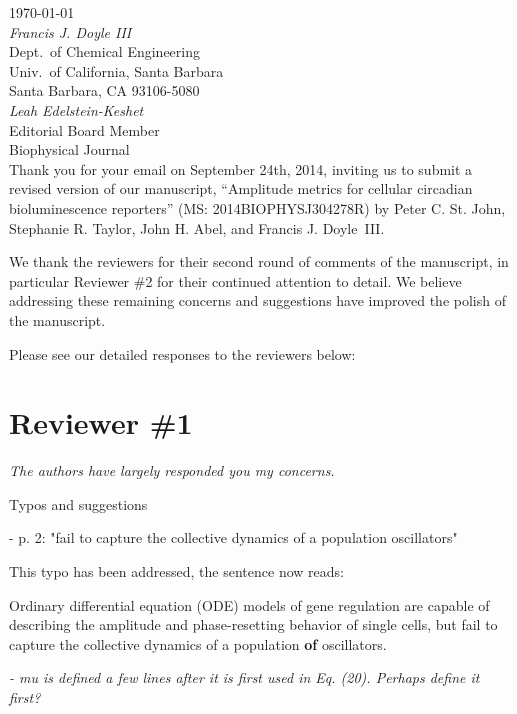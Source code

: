\documentclass[11pt, letterpaper]{article}
\newenvironment{reviewer}{\itshape\color{gray}}{}
\newenvironment{manuscript}[1]{\begin{center}\begin{tcolorbox}[colback=green!5!white,colframe=green!75!black,width=0.8\textwidth,title={#1},breakable,fonttitle=\bfseries]}{\end{tcolorbox}\end{center}}
\begin{document}
\today\\

{\itshape Francis J. Doyle III}\\
Dept.\ of Chemical Engineering\\
Univ.\ of California, Santa Barbara\\
Santa Barbara, CA 93106-5080\\

{\itshape Leah Edelstein-Keshet}\\
Editorial Board Member\\
Biophysical Journal\\

Thank you for your email on September 24th, 2014, inviting us to submit a revised version of our manuscript, ``Amplitude metrics for cellular circadian bioluminescence reporters'' (MS: 2014BIOPHYSJ304278R) by Peter C. St. John, Stephanie R. Taylor, John H. Abel, and Francis J. Doyle~III.

We thank the reviewers for their second round of comments of the manuscript, in particular Reviewer \#2 for their continued attention to detail. We believe addressing these remaining concerns and suggestions have improved the polish of the manuscript.

Please see our detailed responses to the reviewers below: 

\section*{Reviewer \#1}
\begin{reviewer}
The authors have largely responded you my concerns. 
 
Typos and suggestions 
 
- p. 2: "fail to capture the collective dynamics of a population oscillators" 
\end{reviewer}

This typo has been addressed, the sentence now reads:

\begin{manuscript}{Page 2}
  Ordinary differential equation (ODE) models of gene regulation are capable of describing the amplitude and phase-resetting behavior of single cells, but fail to capture the collective dynamics of a population {\bfseries of} oscillators.
\end{manuscript}
 
\begin{reviewer}
- mu is defined a few lines after it is first used in Eq. (20). Perhaps define it first? 
\end{reviewer}
\end{document}
